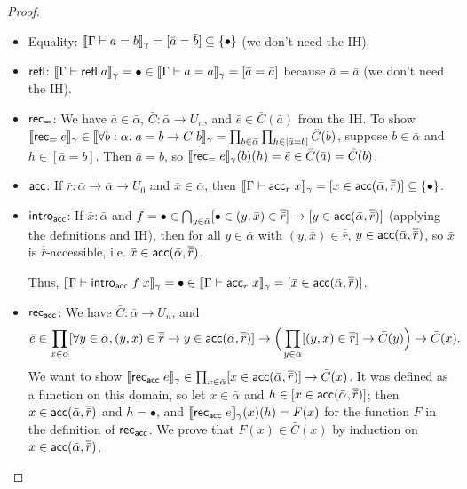 \begin{proof}
\begin{itemize}
\item Equality: $\scott{\Gamma\vdash a=b}_\gamma=[\bar a=\bar b]\subseteq\{\bullet\}$ (we don't need the IH).
\item $\mathsf{refl}$: $\scott{\Gamma\vdash \refl\;a}_\gamma=\bullet\in\scott{\Gamma\vdash a=a}_\gamma=[\bar a=\bar a]$ because $\bar a=\bar a$ (we don't need the IH).
\item $\mathsf{rec}_=$: We have $\bar a\in\bar\alpha$, $\bar C:\bar\alpha\to U_n$, and $\bar e\in\bar C(\bar a)$ from the IH. To show $\llbracket \mathsf{rec}_=\;e\rrbracket_\gamma\in\llbracket \forall b:\alpha.\;a=b\to C\;b\rrbracket_\gamma=\prod_{b\in\bar\alpha}\prod_{h\in[\bar a=b]}\bar C(b)$, suppose $b\in\bar\alpha$ and $h\in[\bar a=b]$. Then $\bar a=b$, so $\llbracket \mathsf{rec}_=\;e\rrbracket_\gamma(b)(h)=\bar e\in \bar C(\bar a)=\bar C(b)$.
\item $\mathsf{acc}$: If $\bar r:\bar\alpha\to\bar\alpha\to U_0$ and $\bar x\in\bar\alpha$, then $\scott{\Gamma\vdash\acc_r\;x}_\gamma=[x\in\acc(\bar\alpha,\overline{\bar r})]\subseteq\{\bullet\}$.
\item $\mathsf{intro}_{\mathsf{acc}}$: If $\bar x:\bar\alpha$ and $\bar f=\bullet\in\bigcap_{y\in\bar\alpha}[\bullet\in (y,\bar x)\in\overline{\bar r}]\to[y\in\mathsf{acc}(\bar\alpha,\overline{\bar r})]$ (applying the definitions and IH), then for all $y\in\bar\alpha$ with $(y,\bar x)\in\overline{\bar r}$, $y\in\mathsf{acc}(\bar\alpha,\overline{\bar r})$, so $\bar x$ is $\overline{\bar r}$-accessible, i.e. $\bar x\in\mathsf{acc}(\bar\alpha,\overline{\bar r})$.

Thus, $\scott{\Gamma\vdash\intro_\acc\;f\;x}_\gamma=\bullet\in\scott{\Gamma\vdash\acc_r\;x}_\gamma=[\bar x\in\acc(\bar\alpha,\overline{\bar r})]$.
\item $\mathsf{rec}_{\mathsf{acc}}$: We have $\bar C:\bar\alpha\to U_n$, and
$$\bar e\in\prod_{x\in\bar\alpha}[\forall y\in\bar\alpha,(y,x)\in\overline{\bar r}\to y\in\mathsf{acc}(\bar\alpha,\overline{\bar r})]\to\Big(\prod_{y\in\bar\alpha}[(y,x)\in\overline{\bar r}]\to\bar C(y)\Big)\to\bar C(x).$$
We want to show $\llbracket \mathsf{rec}_{\mathsf{acc}}\;e\rrbracket_\gamma\in\prod_{x\in\bar\alpha}[x\in\mathsf{acc}(\bar\alpha,\overline{\bar r})]\to\bar C(x)$. It was defined as a function on this domain, so let $x\in\bar\alpha$ and $h\in[x\in\mathsf{acc}(\bar\alpha,\overline{\bar r})]$; then $x\in\mathsf{acc}(\bar\alpha,\overline{\bar r})$ and $h=\bullet$, and $\llbracket \mathsf{rec}_{\mathsf{acc}}\;e\rrbracket_\gamma(x)(h)=F(x)$ for the function $F$ in the definition of $\mathsf{rec}_{\mathsf{acc}}$. We prove that $F(x)\in\bar C(x)$ by induction on $x\in\mathsf{acc}(\bar\alpha,\overline{\bar r})$.


\end{itemize}
\end{proof}

